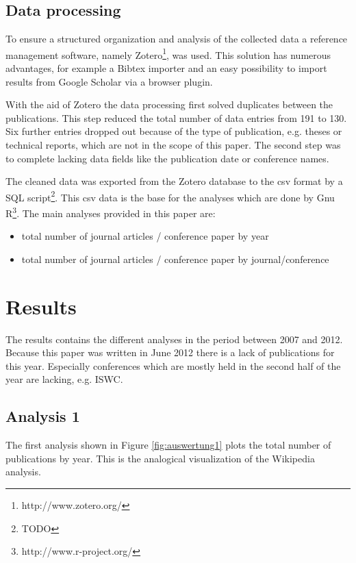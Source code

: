 \documentclass[english]{lni}
\begin{document}
\subsection{Data processing}
\label{sec-2-2}

   To ensure a structured organization and analysis of the collected data a
   reference management software, namely Zotero\footnote{http://www.zotero.org/ }, was used. This solution
   has numerous advantages, for example a Bibtex importer and an easy possibility to import
   results from Google Scholar via a browser plugin.

   With the aid of Zotero the data processing first solved duplicates between
   the publications. This step reduced the total number of data entries from 191
   to 130. Six further entries dropped out because of the type of publication,
   e.g. theses or technical reports, which are not in the scope of this
   paper. The second step was to complete lacking data fields like the
   publication date or conference names.

   The cleaned data was exported from the Zotero database to the csv format by a
   SQL script\footnote{TODO }. This csv data is the base for the analyses which are done by
   Gnu R\footnote{http://www.r-project.org/ }. The main analyses provided in this paper are:
\begin{itemize}
\item total number of journal articles / conference paper by year
\item total number of journal articles / conference paper by journal/conference
\end{itemize}
\section{Results}
\label{sec-3}

  The results contains the different analyses in the period between 2007
  and 2012. Because this paper was written in June 2012 there is a lack of
  publications for this year. Especially conferences which are mostly held in the
  second half of the year are lacking, e.g. ISWC.
\subsection{Analysis 1}
\label{sec-3-1}

   The first analysis shown in Figure \ref{fig:auswertung1} plots the total
   number of publications by year. This is the analogical visualization of the
   Wikipedia analysis.
\end{document}
